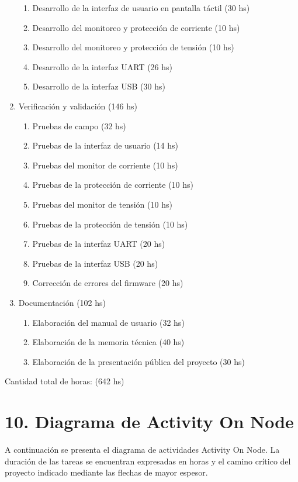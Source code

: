 \documentclass[
11pt, %
]{charter}
\begin{document}
\begin{enumerate}
\begin{enumerate}
	\item Desarrollo de la interfaz de usuario en pantalla táctil (30 hs)
	\item Desarrollo del monitoreo y protección de corriente (10 hs)
	\item Desarrollo del monitoreo y protección de tensión (10 hs)
	\item Desarrollo de la interfaz UART (26 hs)
	\item Desarrollo de la interfaz USB (30 hs)
	\end{enumerate}
\item Verificación y validación (146 hs)
	\begin{enumerate}
	\item Pruebas de campo (32 hs)
	\item Pruebas de la interfaz de usuario (14 hs)
	\item Pruebas del monitor de corriente (10 hs)
	\item Pruebas de la protección de corriente (10 hs)
	\item Pruebas del monitor de tensión (10 hs)
	\item Pruebas de la protección de tensión (10 hs)
	\item Pruebas de la interfaz UART (20 hs)
	\item Pruebas de la interfaz USB (20 hs)
	\item Corrección de errores del firmware (20 hs)
	\end{enumerate}
\item Documentación (102 hs)
	\begin{enumerate}
	\item Elaboración del manual de usuario (32 hs)
	\item Elaboración de la memoria técnica (40 hs)
	\item Elaboración de la presentación pública del proyecto (30 hs)
	\end{enumerate}
\end{enumerate}

Cantidad total de horas: (642 hs)

\section{10. Diagrama de Activity On Node}
\label{sec:AoN}

A continuación se presenta el diagrama de actividades Activity On Node. La duración de las tareas se encuentran expresadas en horas y el camino crítico del proyecto indicado mediante las flechas de mayor espesor.
\end{document}
